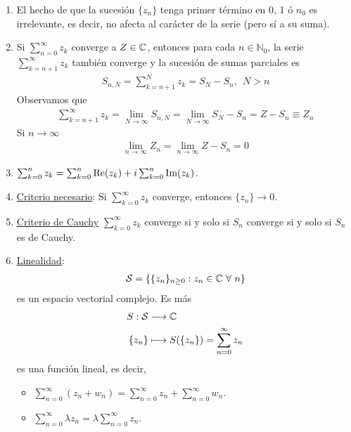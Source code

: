 \begin{obs}
    \begin{enumerate}
        \item El hecho de que la sucesión $\{z_n\}$ tenga primer término en 0, 1 ó $n_0$ es irrelevante, es decir, no afecta al carácter de la serie (pero sí a su suma).
        \item Si $\sum_{n=0}^{\infty}{z_k}$ converge a $Z \in \mathbb{C}$, entonces para cada $n \in \mathbb{N}_0$, la serie $\sum_{k = n+1}^{\infty}{z_k}$ también converge y la sucesión de sumas parciales es
              \begin{align*}
                  S_{n,N} = \sum_{k = n+1}^{N}{z_k} = S_N - S_n, \ \ N > n
              \end{align*}
              Observamos que
              \begin{align*}
                  \sum_{k = n+1}^{\infty}{z_k} = \lim_{N \to \infty}{S_{n,N}} = \lim_{N \to \infty}{S_N - S_n} = Z - S_n \equiv Z_n
              \end{align*}
              Si $n \to \infty$
              \begin{align*}
                  \lim_{n \to \infty}{Z_n} = \lim_{n \to \infty}{Z - S_n} = 0
              \end{align*}
        \item $\sum_{k=0}^{n}{z_k} = \sum_{k=0}^{n}{\text{Re}(z_k)} + i\sum_{k=0}^{n}{\text{Im}(z_k)}$.
        \item \underline{Criterio necesario}: Si $\sum_{k=0}^{\infty}{z_k}$ converge, entonces $\{z_n\} \to 0$.
        \item \underline{Criterio de Cauchy} $\sum_{k=0}^{\infty}{z_k}$ converge si y solo si $S_n$ converge si y solo si $S_n$ es de Cauchy.
        \item \underline{Linealidad}:
              \begin{align*}
                  \mathcal{S} = \{ \{z_n\}_{n \ge 0} : z_n \in \com \ \forall \ n \}
              \end{align*}
              es un espacio vectorial complejo. Es más
              \begin{align*}
                  S : \mathcal{S} & \longrightarrow \mathbb{C}                              \\
                  \{z_n\}         & \longmapsto S(\{z_n\}) = \sum_{n=0}^{\infty}{z_n}
              \end{align*}
              es una función lineal, es decir,
              \begin{itemize}
                  \item $\sum_{n=0}^{\infty}{(z_n + w_n)} = \sum_{n=0}^{\infty}{z_n} + \sum_{n=0}^{\infty}{w_n}$.
                  \item $\sum_{n=0}^{\infty}{\lambda z_n} = \lambda \sum_{n=0}^{\infty}{z_n}$.
              \end{itemize}
    \end{enumerate}
\end{obs}

